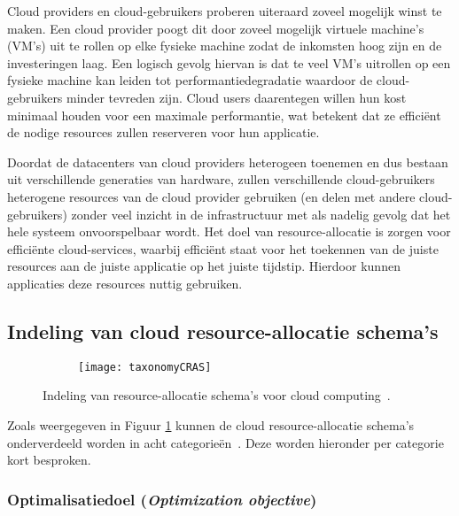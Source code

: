 Cloud providers en cloud-gebruikers proberen uiteraard zoveel mogelijk winst te maken. Een cloud provider poogt dit door zoveel mogelijk virtuele machine's (VM's) uit te rollen op elke fysieke machine zodat de inkomsten hoog zijn en de investeringen laag. Een logisch gevolg hiervan is dat te veel VM's uitrollen op een fysieke machine kan leiden tot performantiedegradatie waardoor de cloud-gebruikers minder tevreden zijn. Cloud users daarentegen willen hun kost minimaal houden voor een maximale performantie, wat betekent dat ze efficiënt  de nodige resources zullen reserveren voor hun applicatie.

Doordat de datacenters van cloud providers heterogeen toenemen en dus bestaan uit verschillende generaties van hardware, zullen verschillende cloud-gebruikers heterogene resources van de cloud provider gebruiken (en delen met andere cloud-gebruikers) zonder veel inzicht in de infrastructuur met als nadelig gevolg dat het hele systeem onvoorspelbaar wordt. Het doel van resource-allocatie is zorgen voor efficiënte cloud-services, waarbij efficiënt staat voor het toekennen van de juiste resources aan de juiste applicatie op het juiste tijdstip. Hierdoor kunnen applicaties deze resources nuttig gebruiken.

\subsection{Indeling van cloud resource-allocatie schema's}

\begin{figure}
	\centering
	\captionsetup{justification=centering}
	\begin{subfigure}{\textwidth}
		\centering
		\centerline{
			\texttt{[image: taxonomyCRAS]}
		}
	\end{subfigure}
	\caption{Indeling van resource-allocatie schema's voor cloud computing~\cite{Yousafzai2016}.}
	\label{fig:taxonomyCRAS}
\end{figure}

Zoals weergegeven in Figuur \ref{fig:taxonomyCRAS} kunnen de cloud resource-allocatie schema's onderverdeeld worden in acht categorieën~\cite{Yousafzai2016}. Deze worden hieronder per categorie kort besproken.

\subsubsection{Optimalisatiedoel (\textit{Optimization objective})}

